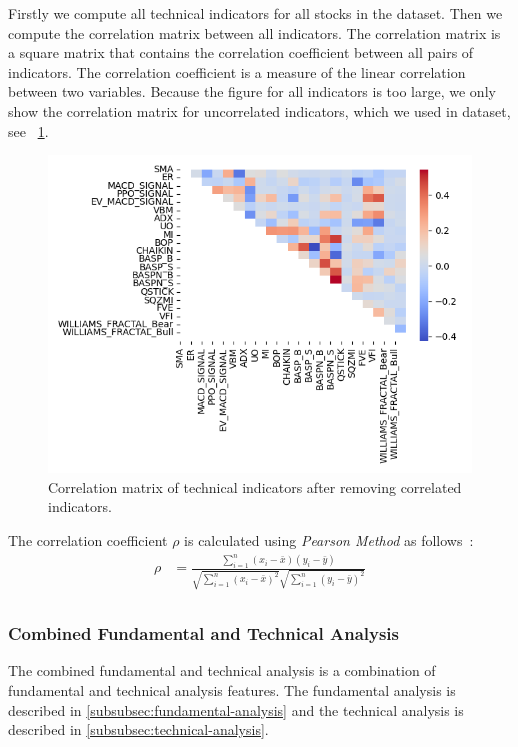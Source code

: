 \documentclass[../xlapes02]{subfiles}
\begin{document}
    Firstly we compute all technical indicators for all stocks in the dataset. Then we compute the correlation matrix between all indicators. The correlation matrix is a square matrix that contains the correlation coefficient between all pairs of indicators. The correlation coefficient is a measure of the linear correlation between two variables. Because the figure for all indicators is too large, we only show the correlation matrix for uncorrelated indicators, which we used in dataset, see ~\cref{fig:ta_correlation_matrix_uncorrelated_indicators}.
    \begin{figure}[h]
        \includegraphics[width=0.95\linewidth]{image/ta_correlation_matrix_uncorrelated_indicators}
        \centering
        \caption{Correlation matrix of technical indicators after removing correlated indicators.}
        \label{fig:ta_correlation_matrix_uncorrelated_indicators}
    \end{figure}

    The correlation coefficient $\rho$ is calculated using \emph{Pearson Method} as follows~\cite{enwiki:1146097966}:
    \begin{equation}
        \begin{split}
            \rho&=\frac{\sum_{i=1}^{n}(x_i-\bar{x})(y_i-\bar{y})}{\sqrt{\sum_{i=1}^{n}(x_i-\bar{x})^2}\sqrt{\sum_{i=1}^{n}(y_i-\bar{y})^2}}\\
        \end{split}
    \end{equation}

    \subsubsection{Combined Fundamental and Technical Analysis}\label{subsubsec:combined-fundamental-and-technical-analysis}
    The combined fundamental and technical analysis is a combination of fundamental and technical analysis features. The fundamental analysis is described in \cref{subsubsec:fundamental-analysis} and the technical analysis is described in \cref{subsubsec:technical-analysis}.
\end{document}
